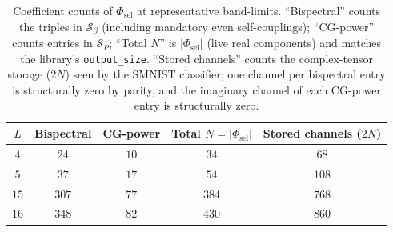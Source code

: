 \documentclass{article}
\theoremstyle{definition}
\theoremstyle{remark}
\theoremstyle{definition}
\begin{document}
\begin{table}[h]
  \caption{Coefficient counts of $\Phi_{\mathrm{sel}}$ at
    representative band-limits. ``Bispectral'' counts the triples in
    $\mathcal{S}_\beta$ (including mandatory even self-couplings);
    ``CG-power'' counts entries in $\mathcal{S}_P$; ``Total $N$'' is
    $|\Phi_{\mathrm{sel}}|$ (live real components) and matches the
    library's \texttt{output\_size}. ``Stored channels'' counts the
    complex-tensor storage ($2N$) seen by the SMNIST classifier;
    one channel per bispectral entry is structurally zero by
    parity, and the imaginary channel of each CG-power entry is
    structurally zero.}
  \label{tab:app-counts}
  \centering
  \small
  \setlength{\tabcolsep}{6pt}
  \begin{tabular}{ccccc}
    \toprule
    $L$ & Bispectral & CG-power & Total $N=|\Phi_{\mathrm{sel}}|$
        & Stored channels ($2N$) \\
    \midrule
    $4$  & $24$  & $10$  & $34$  & $68$  \\
    $5$  & $37$  & $17$  & $54$  & $108$ \\
    $15$ & $307$ & $77$  & $384$ & $768$ \\
    $16$ & $348$ & $82$  & $430$ & $860$ \\
    \bottomrule
  \end{tabular}
\end{table}
\end{document}
